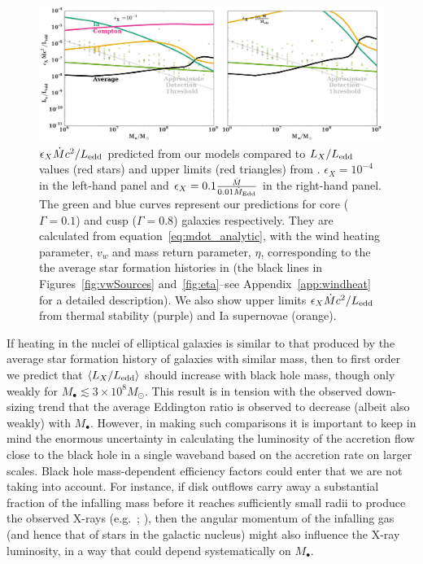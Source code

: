 \documentclass[usenatbib,fleqn]{mn2e}
\newcommand{\Mdot}{\dot{M}}
\newcommand{\MdotEdd}{\dot{M}_{\rm Edd}}
\begin{document}
\begin{figure}
\includegraphics[width=\textwidth]{miller.pdf}
\caption{\label{fig:miller} $\epsilon_X \Mdot c^2/L_{\rm edd}$ predicted
  from our models compared to $L_X/L_{\rm edd}$ values (red stars) and
  upper limits (red triangles) from \citet{Miller+15}.
  $\epsilon_X=10^{-4}$ in the left-hand panel and $\epsilon_X=0.1
  \frac{\Mdot}{0.01 \MdotEdd}$ in the right-hand panel. The green and
  blue curves represent our predictions for core ($\Gamma=0.1$)
  and cusp ($\Gamma=0.8$) galaxies respectively. They are calculated
  from equation~\eqref{eq:mdot_analytic}, with the wind heating
  parameter, $v_w$ and mass return parameter, $\eta$, corresponding to
  the the average star formation histories in
  \citet{MosterNaab+:2013a} (the black lines in
  Figures~\ref{fig:vwSources} and~\ref{fig:eta}--see
  Appendix~\ref{app:windheat} for a detailed description).
  We also show upper limits $\epsilon_X \Mdot c^2/L_{\rm edd}$ from
  thermal stability (purple) and Ia supernovae (orange).}
\end{figure}

If heating in the nuclei of elliptical galaxies is similar to that
produced by the average star formation history of galaxies with
similar mass, then to first order we predict that $\langle
L_{X}/L_{\rm edd}\rangle$ should increase with black hole mass, though
only weakly for $M_{\bullet} \lesssim 3\times 10^{8}M_{\odot}$.  This
result is in tension with the observed down-sizing trend that the
average Eddington ratio is observed to decrease (albeit also weakly)
with $M_{\bullet}$.  However, in making such comparisons it is
important to keep in mind the enormous uncertainty in calculating the
luminosity of the accretion flow close to the black hole in a single
waveband based on the accretion rate on larger scales.  Black hole
mass-dependent efficiency factors could enter that we are not taking
into account.  For instance, if disk outflows carry away a substantial
fraction of the infalling mass before it reaches sufficiently small
radii to produce the observed X-rays
(e.g.~\citealt{Blandford&Begelman99}; \citealt{Li+13}), then the
angular momentum of the infalling gas (and hence that of stars in the
galactic nucleus) might also influence the X-ray luminosity, in a way
that could depend systematically on $M_{\bullet}$.
\end{document}
